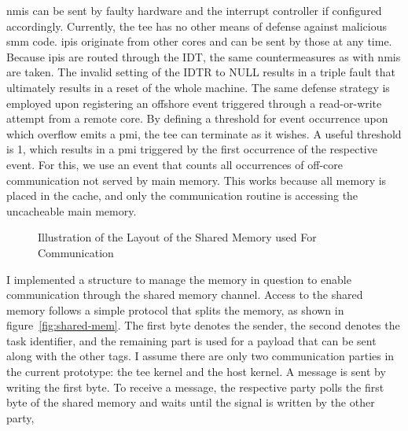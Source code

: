 \glspl{nmi} can be sent by faulty hardware and the interrupt controller if
configured accordingly. Currently, the \gls{tee} has no other means of defense
against malicious \gls{smm} code. \glspl{ipi} originate from other cores and can
be sent by those at any time. Because \glspl{ipi} are routed through the IDT,
the same countermeasures as with \glspl{nmi} are taken. The invalid setting of
the IDTR to NULL results in a triple fault that ultimately results in a reset of
the whole machine. The same defense strategy is employed upon registering an
offshore event triggered through a read-or-write attempt from a remote core. By
defining a threshold for event occurrence upon which overflow emits a \gls{pmi},
the \gls{tee} can terminate as it wishes. A useful threshold is 1, which results
in a \gls{pmi} triggered by the first occurrence of the respective event. For
this, we use an event that counts all occurrences of off-core communication not
served by main memory. This works because all memory is placed in the cache, and
only the communication routine is accessing the uncacheable main memory. \\

\begin{center}
    \begin{figure}
        \centering
        
        \caption{Illustration of the Layout of the Shared Memory used For Communication}
        \label{fig:state:technical:paging}
    \end{figure}
\end{center}

I implemented a structure to manage the memory in question to enable
communication through the shared memory channel. Access to the shared memory
follows a simple protocol that splits the memory, as shown in
figure~\ref{fig:shared-mem}. The first byte denotes the sender, the second
denotes the task identifier, and the remaining part is used for a payload that
can be sent along with the other tags. I assume there are only two communication
parties in the current prototype: the \gls{tee} kernel and the host kernel. A
message is sent by writing the first byte. To receive a message, the respective
party polls the first byte of the shared memory and waits until the signal is
written by the other party, \\

